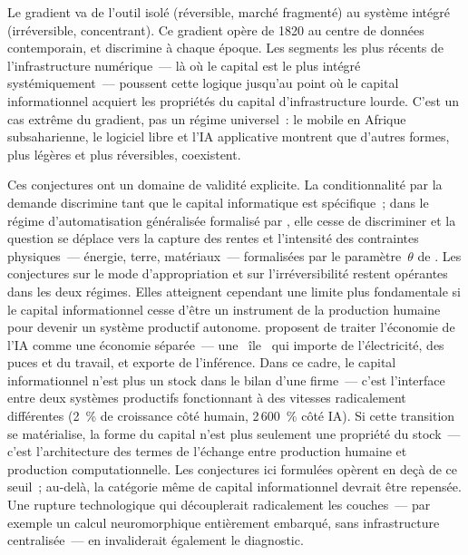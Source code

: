 Le gradient va de l'outil isolé (réversible, marché fragmenté) au système intégré (irréversible, concentrant). Ce gradient opère de 1820 au centre de données contemporain, et discrimine à chaque époque. Les segments les plus récents de l'infrastructure numérique~--- là où le capital est le plus intégré systémiquement~--- poussent cette logique jusqu'au point où le capital informationnel acquiert les propriétés du capital d'infrastructure lourde. C'est un cas extrême du gradient, pas un régime universel~: le mobile en Afrique subsaharienne, le logiciel libre et l'IA applicative montrent que d'autres formes, plus légères et plus réversibles, coexistent.

Ces conjectures ont un domaine de validité explicite. La conditionnalité par la demande discrimine tant que le capital informatique est spécifique~; dans le régime d'automatisation généralisée formalisé par \textcite{restrepo_wont_be_missed_2025}, elle cesse de discriminer et la question se déplace vers la capture des rentes et l'intensité des contraintes physiques~--- énergie, terre, matériaux~--- formalisées par le paramètre~$\theta$ de \textcite{jones_ai_rd_2025}. Les conjectures sur le mode d'appropriation et sur l'irréversibilité restent opérantes dans les deux régimes. Elles atteignent cependant une limite plus fondamentale si le capital informationnel cesse d'être un instrument de la production humaine pour devenir un système productif autonome. \textcite{korinek_mckelvey_2026} proposent de traiter l'économie de l'IA comme une économie séparée~--- une \og~île~\fg{} qui importe de l'électricité, des puces et du travail, et exporte de l'inférence. Dans ce cadre, le capital informationnel n'est plus un stock dans le bilan d'une firme~--- c'est l'interface entre deux systèmes productifs fonctionnant à des vitesses radicalement différentes (2~\% de croissance côté humain, 2\,600~\% côté IA). Si cette transition se matérialise, la forme du capital n'est plus seulement une propriété du stock~--- c'est l'architecture des termes de l'échange entre production humaine et production computationnelle. Les conjectures ici formulées opèrent en deçà de ce seuil~; au-delà, la catégorie même de capital informationnel devrait être repensée. Une rupture technologique qui découplerait radicalement les couches~--- par exemple un calcul neuromorphique entièrement embarqué, sans infrastructure centralisée~--- en invaliderait également le diagnostic.
